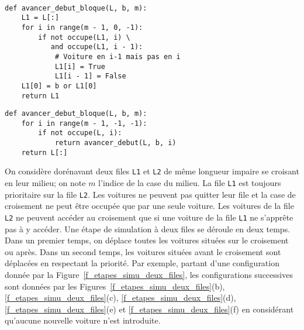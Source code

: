 \ifprof
\begin{corrige}~\\ \vspace{-.5cm}
\begin{lstlisting}
def avancer_debut_bloque(L, b, m):
    L1 = L[:]
    for i in range(m - 1, 0, -1):
        if not occupe(L1, i) \
           and occupe(L1, i - 1): 
            # Voiture en i-1 mais pas en i
            L1[i] = True
            L1[i - 1] = False
    L1[0] = b or L1[0]
    return L1
\end{lstlisting}

\begin{lstlisting}
def avancer_debut_bloque(L, b, m):
    for i in range(m - 1, -1, -1):
        if not occupe(L, i):
            return avancer_debut(L, b, i)
    return L[:]
\end{lstlisting}
\end{corrige}
\else
\fi


On considère dorénavant deux files \lstinline{L1} et \lstinline{L2} de même longueur impaire se croisant en leur
milieu; on note $m$ l'indice de la case du milieu. La file \lstinline{L1} est toujours prioritaire sur la file \lstinline{L2}. Les
voitures ne peuvent pas quitter leur file et la case de croisement ne peut être occupée que par une
seule voiture. Les voitures de la file \lstinline{L2} ne peuvent accéder au croisement que si une voiture de la
file \lstinline{L1} ne s'apprête pas à y accéder. Une étape de simulation à deux files se déroule en deux temps.
Dans un premier temps, on déplace toutes les voitures situées sur le croisement ou après. Dans un
second temps, les voitures situées avant le croisement sont déplacées en respectant la priorité. Par
exemple, partant d'une configuration donnée par la Figure~\ref{f_etapes_simu_deux_files}, les configurations successives sont
données par les Figures~\ref{f_etapes_simu_deux_files}(b), \ref{f_etapes_simu_deux_files}(c), \ref{f_etapes_simu_deux_files}(d), \ref{f_etapes_simu_deux_files}(e) et \ref{f_etapes_simu_deux_files}(f) en considérant qu'aucune nouvelle voiture n'est
introduite.






